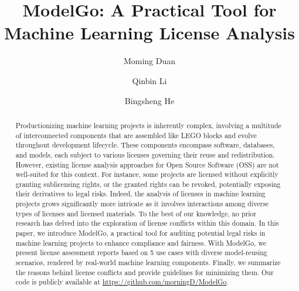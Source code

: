\documentclass[sigconf]{acmart}
\begin{document}
\title{ModelGo: A Practical Tool for Machine Learning License Analysis}


\author{Moming Duan}


\author{Qinbin Li}

\author{Bingsheng He}

\renewcommand{\shortauthors}{Moming Duan, Qinbin Li, \& Bingsheng He}

\begin{abstract}
  Productionizing machine learning projects is inherently complex, involving a multitude of interconnected components that are assembled like LEGO blocks and evolve throughout development lifecycle.
  These components encompass software, databases, and models, each subject to various licenses governing their reuse and redistribution.
  However, existing license analysis approaches for Open Source Software (OSS) are not well-suited for this context.
  For instance, some projects are licensed without explicitly granting sublicensing rights, or the granted rights can be revoked, potentially exposing their derivatives to legal risks.
  Indeed, the analysis of licenses in machine learning projects grows significantly more intricate as it involves interactions among diverse types of licenses and licensed materials.
  To the best of our knowledge, no prior research has delved into the exploration of license conflicts within this domain.
  In this paper, we introduce ModelGo, a practical tool for auditing potential legal risks in machine learning projects to enhance compliance and fairness.
  With ModelGo, we present license assessment reports based on 5 use cases with diverse model-reusing scenarios, rendered by real-world machine learning components.
  Finally, we summarize the reasons behind license conflicts and provide guidelines for minimizing them.
  Our code is publicly available at \url{https://github.com/morningD/ModelGo}.
\end{abstract}
\end{document}
